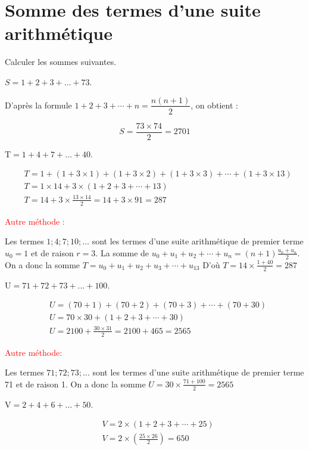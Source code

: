 \documentclass[11pt,a4paper]{article}  %
\begin{document}
\section{Somme des termes d'une suite arithmétique}


Calculer les sommes suivantes.
	\begin{enumMet}
	\item $S=1+2+3+\ldots+73$.
	\begin{corrBox}
		D'après la formule $1+2+3+\cdots+n=\dfrac{n(n+1)}{2}$, on obtient :
		
		$$
		S=\frac{73 \times 74}{2}=2701
		$$
				
	\end{corrBox}
	\item $\mathrm{T}=1+4+7+\ldots+40$.
	\begin{corrBox}
		$$
		\begin{aligned}
			& T=1+(1+3 \times 1)+(1+3 \times 2)+(1+3 \times 3)+\cdots+(1+3 \times 13) \\
			& T=1 \times 14+3 \times(1+2+3+\cdots+13) \\
			& T=14+3 \times \frac{13 \times 14}{2}=14+3 \times 91=287
		\end{aligned}
		$$
		
		
		\textcolor{red}{Autre méthode :}
		
		Les termes $1 ; 4 ; 7 ; 10 ; \ldots$ sont les termes d'une suite arithmétique de premier terme $u_0=1$ et de raison $r=3$. La somme de $u_0+u_1+u_2+\cdots+u_n=(n+1) \frac{u_0+u_n}{2}$. On a donc la somme $T=u_0+u_1+u_2+u_3+\cdots+u_{13}$ D'où $T=14 \times \frac{1+40}{2}=287$		
	\end{corrBox}
	\item $\mathrm{U}=71+72+73+\ldots+100$.
	\begin{corrBox}
	$$
	\begin{aligned}
		& U=(70+1)+(70+2)+(70+3)+\cdots+(70+30) \\
		& U=70 \times 30+(1+2+3+\cdots+30) \\
		& U=2100+\frac{30 \times 31}{2}=2100+465=2565
	\end{aligned}
	$$
	
	
	\textcolor{red}{Autre méthode:}
	
	Les termes $71 ; 72 ; 73 ; \ldots$ sont les termes d'une suite arithmétique de premier terme 71 et de raison 1.
	On a donc la somme $U=30 \times \frac{71+100}{2}=2565$		
	\end{corrBox}
	\item $\mathrm{V}=2+4+6+\ldots+50$.
	\begin{corrBox}
		$$
		\begin{aligned}
			& V=2 \times(1+2+3+\cdots+25) \\
			& V=2 \times\left(\frac{25 \times 26}{2}\right)=650
		\end{aligned}
		$$
		

\end{corrBox}
\end{enumMet}
\end{document}
